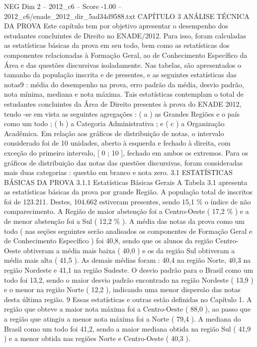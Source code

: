 \begin{textsample}{NEG Dim 2 – 2012\_c6 – Score -1.00 – 2012\_c6/enade\_2012\_dir\_5ad34d9588.txt}  \label{ex:f2_neg_190}
CAPÍTULO 3 ANÁLISE TÉCNICA DA PROVA Este capítulo tem por objetivo apresentar o desempenho dos estudantes concluintes de Direito no ENADE/2012.
Para isso, foram calculadas as estatísticas básicas da prova em seu todo, bem como as estatísticas dos componentes relacionadas à Formação Geral, ao de Conhecimento Específico da Área e das questões discursivas isoladamente.
Nas tabelas, são apresentados o tamanho da população inscrita e de presentes, e as seguintes estatísticas das notas9 : média do desempenho na prova, erro padrão da média, desvio padrão, nota mínima, mediana e nota máxima.
Tais estatísticas contemplam o total de estudantes concluintes da Área de Direito presentes à prova do ENADE 2012, tendo -se em vista as seguintes agregações : ( a ) as Grandes Regiões e o país como um todo ; ( b ) a Categoria Administrativa ; e ( c ) a Organização Acadêmica.
Em relação aos gráficos de distribuição de notas, o intervalo considerado foi de 10 unidades, aberto à esquerda e fechado à direita, com exceção do primeiro intervalo, [ 0 ; 10 ], fechado em ambos os extremos.
Para os gráficos de distribuição das notas das questões discursivas, foram consideradas mais duas categorias : questão em branco e nota zero. 3.1 ESTATÍSTICAS BÁSICAS DA PROVA 3.1.1 Estatísticas Básicas Gerais A Tabela 3.1 apresenta as estatísticas básicas da prova por grande Região.
A população total de inscritos foi de 123.211.
Destes, 104.662 estiveram presentes, sendo 15,1 \% o índice de não comparecimento.
A Região de maior abstenção foi a Centro-Oeste ( 17,2 \% ) e a de menor abstenção foi a Sul ( 12,2 \% ).
A média das notas da prova como um todo ( nas seções seguintes serão analisados os componentes de Formação Geral e de Conhecimento Específico ) foi 40,8, sendo que os alunos da região Centro-Oeste obtiveram a média mais baixa ( 40,0 ) e os da região Sul obtiveram a média mais alta ( 41,5 ).
As demais médias foram : 40,4 na região Norte, 40,3 na região Nordeste e 41,1 na região Sudeste.
O desvio padrão para o Brasil como um todo foi 13,2, sendo o maior desvio padrão encontrado na região Nordeste ( 13,9 ) e o menor na região Norte ( 12,2 ), indicando uma menor dispersão das notas desta última região. 9 Essas estatísticas e outras estão definidas no Capítulo 1.
A região que obteve a maior nota máxima foi a Centro-Oeste ( 88,0 ), ao passo que a região que atingiu a menor nota máxima foi a Norte ( 79,4 ).
A mediana do Brasil como um todo foi 41,2, sendo a maior mediana obtida na região Sul ( 41,9 ) e a menor obtida nas regiões Norte e Centro-Oeste ( 40,3 ).

\end{textsample}
